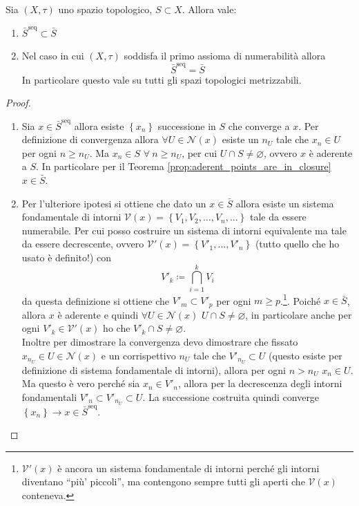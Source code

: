 \begin{theorem}
	Sia $(X,\tau)$ uno spazio topologico, $S \subset X$. Allora vale:
	\begin{enumerate}
		\item $\bar{S}^\text{seq} \subset \bar{S}$
		\item Nel caso in cui $(X, \tau)$ soddisfa il primo assioma di numerabilità allora
		\begin{equation*}
		\bar{S}^\text{seq} = \bar{S}
		\end{equation*}
		 In particolare questo vale su tutti gli spazi topologici metrizzabili.
	\end{enumerate}
\end{theorem}
\begin{proof} \
	\begin{enumerate}
		\item Sia $x \in \bar{S}^\text{seq}$ allora esiste $\left\{x_n\right\}$ successione in $S$ che converge a $x$. Per definizione di convergenza allora $\forall U \in \mathcal{N}(x)$ esiste un $n_U$ tale che $x_n \in U$ per ogni $n \ge n_U$. Ma $x_n \in S$ $\forall \ n \ge n_U$, per cui $U \cap S \neq \varnothing$, ovvero $x$ è aderente a $S$. In particolare per il Teorema \ref{prop:aderent_points_are_in_closure} $x \in \bar{S}$. 
		\item Per l'ulteriore ipotesi si ottiene che dato un $x \in \bar{S}$ allora esiste un sistema fondamentale di intorni $\mathcal{V}(x) = \left\{V_1, V_2, \dots, V_n, \dots\right\}$ tale da essere numerabile. Per cui posso costruire un sistema di intorni equivalente ma tale da essere decrescente, ovvero $\mathcal{V}'(x) = \left\{V'_1, \dots, V'_n\right\}$ (tutto quello che ho usato è definito!) con
		\begin{equation*}
			V'_k \coloneqq \bigcap^k_{i=1} V_i
		\end{equation*}
		da questa definizione si ottiene che $V'_{m} \subset V'_p$ per ogni $m \ge p$.\footnote{$\mathcal{V}'(x)$ è ancora un sistema fondamentale di intorni perché gli intorni diventano \enquote{più' piccoli}, ma contengono sempre tutti gli aperti che $\mathcal{V}(x)$ conteneva.}.
		Poiché $x \in \bar{S}$, allora $x$ è aderente e quindi $\forall U \in \mathcal{N}(x)$ $U \cap S \neq \varnothing$, in particolare anche per ogni $V'_k \in \mathcal{V}'(x)$ ho che $V'_k \cap S \neq \varnothing$. \\ Inoltre per dimostrare la convergenza devo dimostrare che fissato $x_{n_U} \in U \in \mathcal{N}(x)$ e un corrispettivo $n_U$ tale che $V'_{n_U} \subset U$ (questo esiste per definizione di sistema fondamentale di intorni), allora per ogni $n > n_U$ $x_n \in U$. Ma questo è vero perché sia $x_n \in V'_n$, allora per la decrescenza degli intorni fondamentali $V'_{n} \subset V'_{n_U} \subset U$. La successione costruita quindi converge $\left\{x_n\right\} \rightarrow x \in \bar{S}^\text{seq}$.
	\end{enumerate}
\end{proof}

